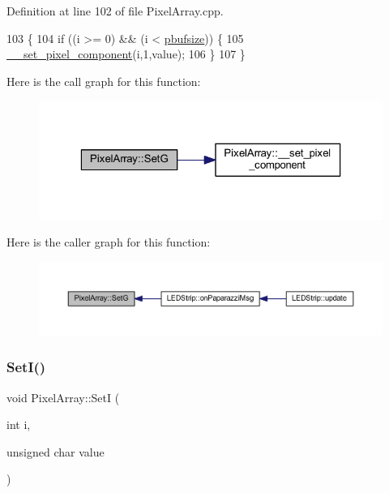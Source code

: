 Definition at line 102 of file Pixel\+Array.\+cpp.


\begin{DoxyCode}
103 \{
104     \textcolor{keywordflow}{if} ((i >= 0) && (i < \hyperlink{class_pixel_array_aca29e70f9b643bff3733ab2e694439a1}{pbufsize})) \{
105         \hyperlink{class_pixel_array_a42c6681bf771332826ecc9ad2a8cea02}{\_\_set\_pixel\_component}(i,1,value);
106     \}
107 \}
\end{DoxyCode}
Here is the call graph for this function\+:\nopagebreak
\begin{figure}[H]
\begin{center}
\leavevmode
\includegraphics[width=323pt]{class_pixel_array_a60ea8084ec95df0d51f46c9b0ff308d5_cgraph}
\end{center}
\end{figure}
Here is the caller graph for this function\+:\nopagebreak
\begin{figure}[H]
\begin{center}
\leavevmode
\includegraphics[width=350pt]{class_pixel_array_a60ea8084ec95df0d51f46c9b0ff308d5_icgraph}
\end{center}
\end{figure}
\mbox{\label{class_pixel_array_afbfac74c674f63d793d85141d3a3b046}} 
\subsubsection{\texorpdfstring{Set\+I()}{SetI()}}
{\footnotesize\ttfamily void Pixel\+Array\+::\+SetI (\begin{DoxyParamCaption}\item[{int}]{i,  }\item[{unsigned char}]{value }\end{DoxyParamCaption})}



